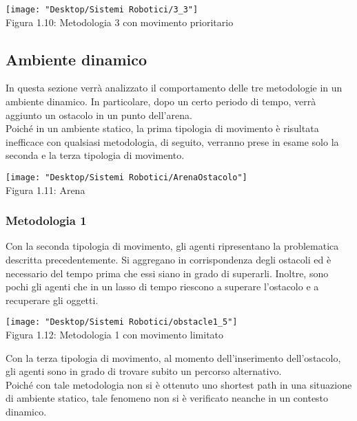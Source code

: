 \documentclass[12pt,a4paper,openright,twoside]{report}
\begin{document}
\begin{center}  
	\texttt{[image: "Desktop/Sistemi Robotici/3\_3"]}
	\\Figura 1.10: Metodologia 3 con movimento prioritario
\end{center}

\subsection{Ambiente dinamico}

In questa sezione verrà analizzato il comportamento delle tre metodologie in un ambiente dinamico. In particolare, dopo un certo periodo di tempo, verrà aggiunto un ostacolo in un punto dell'arena.\\
Poiché in un ambiente statico, la prima tipologia di movimento è risultata inefficace con qualsiasi metodologia, di seguito, verranno prese in esame solo la seconda e la terza tipologia di movimento.\\

\begin{center}  
	\texttt{[image: "Desktop/Sistemi Robotici/ArenaOstacolo"]}
	\\Figura 1.11: Arena
\end{center}

\subsubsection{Metodologia 1}

Con la seconda tipologia di movimento, gli agenti ripresentano la problematica descritta precedentemente. Si aggregano in corrispondenza degli ostacoli ed è necessario del tempo prima che essi siano in grado di superarli. Inoltre, sono pochi gli agenti che in un lasso di tempo riescono a superare l'ostacolo e a recuperare gli oggetti.\\

\begin{center}  
	\texttt{[image: "Desktop/Sistemi Robotici/obstacle1\_5"]}
	\\Figura 1.12: Metodologia 1 con movimento limitato
\end{center}

Con la terza tipologia di movimento, al momento dell'inserimento dell'ostacolo, gli agenti sono in grado di trovare subito un percorso alternativo.\\
Poiché con tale metodologia non si è ottenuto uno shortest path in una situazione di ambiente statico, tale fenomeno non si è verificato neanche in un contesto dinamico.
\end{document}
